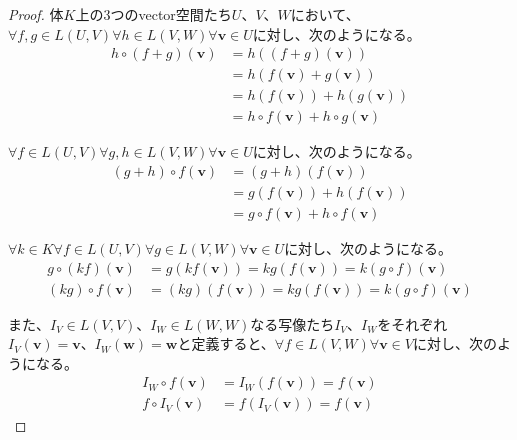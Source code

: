 \documentclass[dvipdfmx]{jsarticle}
\begin{document}
\begin{proof}
体$K$上の3つのvector空間たち$U$、$V$、$W$において、$\forall f,g \in L(U,V)\forall h \in L(V,W)\forall\mathbf{v} \in U$に対し、次のようになる。
\begin{align*}
h \circ (f + g)\left( \mathbf{v} \right) &= h\left( (f + g)\left( \mathbf{v} \right) \right)\\
&= h\left( f\left( \mathbf{v} \right) + g\left( \mathbf{v} \right) \right)\\
&= h\left( f\left( \mathbf{v} \right) \right) + h\left( g\left( \mathbf{v} \right) \right)\\
&= h \circ f\left( \mathbf{v} \right) + h \circ g\left( \mathbf{v} \right)
\end{align*}\par
$\forall f \in L(U,V)\forall g,h \in L(V,W)\forall\mathbf{v} \in U$に対し、次のようになる。
\begin{align*}
(g + h) \circ f\left( \mathbf{v} \right) &= (g + h)\left( f\left( \mathbf{v} \right) \right)\\
&= g\left( f\left( \mathbf{v} \right) \right) + h\left( f\left( \mathbf{v} \right) \right)\\
&= g \circ f\left( \mathbf{v} \right) + h \circ f\left( \mathbf{v} \right)
\end{align*}\par
$\forall k \in K\forall f \in L(U,V)\forall g \in L(V,W)\forall\mathbf{v} \in U$に対し、次のようになる。
\begin{align*}
g \circ (kf)\left( \mathbf{v} \right) &= g\left( kf\left( \mathbf{v} \right) \right) = kg\left( f\left( \mathbf{v} \right) \right) = k(g \circ f)\left( \mathbf{v} \right)\\
(kg) \circ f\left( \mathbf{v} \right) &= (kg)\left( f\left( \mathbf{v} \right) \right) = kg\left( f\left( \mathbf{v} \right) \right) = k(g \circ f)\left( \mathbf{v} \right)
\end{align*}\par
また、$I_{V} \in L(V,V)$、$I_{W} \in L(W,W)$なる写像たち$I_{V}$、$I_{W}$をそれぞれ$I_{V}\left( \mathbf{v} \right) = \mathbf{v}$、$I_{W}\left( \mathbf{w} \right) = \mathbf{w}$と定義すると、$\forall f \in L(V,W)\forall\mathbf{v} \in V$に対し、次のようになる。
\begin{align*}
I_{W} \circ f\left( \mathbf{v} \right) &= I_{W}\left( f\left( \mathbf{v} \right) \right) = f\left( \mathbf{v} \right)\\
f \circ I_{V}\left( \mathbf{v} \right) &= f\left( I_{V}\left( \mathbf{v} \right) \right) = f\left( \mathbf{v} \right)
\end{align*}
\end{proof}
\end{document}
